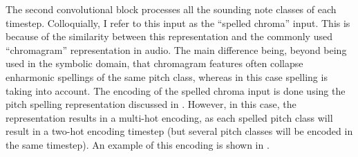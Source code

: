 
The second convolutional block processes all the sounding
note classes of each timestep. Colloquially, I refer to this
input as the ``spelled chroma'' input. This is because of
the similarity between this representation and the commonly
used ``chromagram'' representation in audio. The main
difference being, beyond being used in the symbolic domain,
that chromagram features often collapse enharmonic spellings
of the same pitch class, whereas in this case spelling is
taking into account. The encoding of the spelled chroma
input is done using the pitch spelling representation
discussed in . However, in
this case, the representation results in a multi-hot
encoding, as each spelled pitch class will result in a
two-hot encoding timestep (but several pitch classes will be
encoded in the same timestep). An example of this encoding
is shown in .

